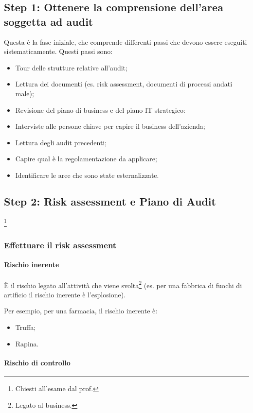 \subsection{Step 1: Ottenere la comprensione dell'area soggetta ad audit}

Questa è la fase iniziale, che comprende differenti passi che devono essere 
eseguiti sistematicamente.
Questi passi sono:
\begin{itemize} 
\item Tour delle strutture relative all'audit;
\item Lettura dei documenti (es. risk assessment, documenti di processi andati 
male);
\item Revisione del piano di business e del piano IT strategico:
\item Interviste alle persone chiave per capire il business dell'azienda;
\item Lettura degli audit precedenti;
\item Capire qual è la regolamentazione da applicare;
\item Identificare le aree che sono state esternalizzate.
\end{itemize}

\subsection{Step 2: Risk assessment e Piano di Audit}\footnote{Chiesti all'esame dal prof.}

\subsubsection{Effettuare il risk assessment}

\paragraph*{Rischio inerente}

È il rischio legato all'attività che viene svolta\footnote{Legato al business.} 
(es. per una fabbrica di fuochi di artificio il rischio inerente è 
l'esplosione).

Per esempio, per una farmacia, il rischio inerente è:
\begin{itemize}
\item Truffa;
\item Rapina.
\end{itemize}

\paragraph*{Rischio di controllo}

